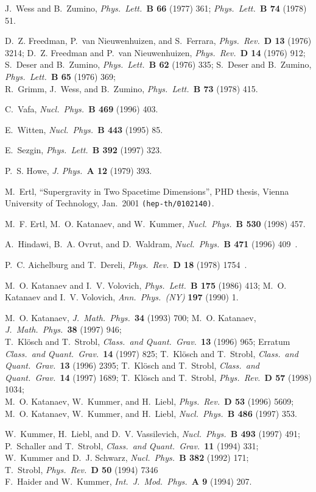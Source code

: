 \documentclass[a4paper,10pt]{article}
\renewcommand{\^}{{}^}
\renewcommand{\_}{\!{}_}
\providecommand\ap[3]    
		{{\it Ann.\ Phys.\ (NY) }{\bf #1} (#2) #3}
\providecommand\cqg[3]  
		{{\it Class.\ and Quant.\ Grav.\ }{\bf #1} (#2) #3}
\providecommand\ijmpa[3] 
		{{\it Int.\ J.\ Mod.\ Phys.\ }{\bf A #1} (#2) #3}
\providecommand\jpha[3]  
		{{\it J. Phys.\ }{\bf A #1} (#2) #3}
\providecommand\jmp[3]   
		{{\it J.\ Math.\ Phys.\ }{\bf #1} (#2) #3}
\providecommand\npb[3]   
		{{\it Nucl.\ Phys.\ }{\bf B #1} (#2) #3}
\providecommand\plb[3]   
		{{\it Phys.\ Lett.\ }{\bf B #1} (#2) #3}
\providecommand\prd[3]   
		{{\it Phys.\ Rev.\ }{\bf D #1} (#2) #3}
\begin{document}
\begin{thebibliography}{99}

J.~Wess and B.~Zumino, \plb{66}{1977}{361};
\plb{74}{1978}{51}.

D.~Z. Freedman, P.~{van Nieuwenhuizen}, and S.~Ferrara, 
\prd{13}{1976}{3214}; 
D.~Z. Freedman and P.~{van Nieuwenhuizen}, 
\prd{14}{1976}{912};\\ 
S.~Deser and B.~Zumino, \plb{62}{1976}{335}; 
S.~Deser and B.~Zumino, \plb{65}{1976}{369}; \\
R.~Grimm, J.~Wess, and B.~Zumino, \plb{73}{1978}{415}. 

C.~Vafa, \npb{469}{1996}{403}. 

E.~Witten, \npb{443}{1995}{85}. 

E.~Sezgin, \plb{392}{1997}{323}. 

P.~S. Howe, \jpha{12}{1979}{393}.

M.\ Ertl, ``Supergravity in Two Spacetime Dimensions'', PHD 
thesis, Vienna University of Technology, Jan.\ 2001 
\texttt{(hep-th/0102140)}. 

M.~F. Ertl, M.~O. Katanaev, and W.~Kummer, 
\npb{530}{1998}{457}.

A.~Hindawi, B.~A. Ovrut, and D.~Waldram, 
\npb{471}{1996}{409}\, . 

P.~C. Aichelburg and T.~Dereli, \prd{18}{1978}{1754}\, .

M.~O. Katanaev and I.~V. Volovich, \plb{175}{1986}{413}; 
M.~O. Katanaev and I.~V. Volovich, \ap{197}{1990}{1}. 

M.~O. Katanaev, \jmp{34}{1993}{700}; 
M.~O. Katanaev, \jmp{38}{1997}{946}; \\
T.~Kl{\"o}sch and T.~Strobl, 
\cqg{13}{1996}{965}; Erratum  \cqg{14}{1997}{825}; 
T.~Kl{\"o}sch and T.~Strobl, \cqg{13}{1996}{2395}; 
T.~Kl{\"o}sch and T.~Strobl, \cqg{14}{1997}{1689}; 
T.~Kl{\"o}sch and T.~Strobl, \prd{57}{1998}{1034};\\ 
M.~O. Katanaev, W.~Kummer, and H.~Liebl, \prd{53}{1996}{5609}; 
M.~O. Katanaev, W.~Kummer, and H.~Liebl, 
\npb{486}{1997}{353}. 

W.~Kummer, H.~Liebl, and D.~V. Vassilevich, 
\npb{493}{1997}{491}; \\ 
P.~Schaller and T.~Strobl, \cqg{11}{1994}{331}; \\
W.~Kummer and D.~J. Schwarz, \npb{382}{1992}{171}; \\
T.~Strobl, \prd{50}{1994}{7346}\; \\
F.~Haider and W.~Kummer, \ijmpa{9}{1994}{207}.  


\end{thebibliography}
\end{document}
